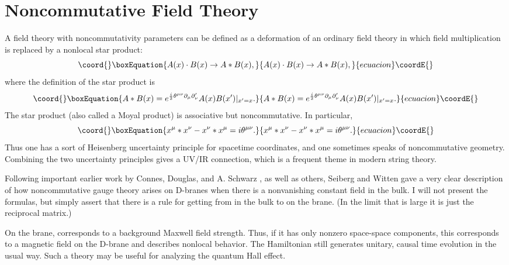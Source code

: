 \documentclass[a4paper,12pt]{article}
\begin{document}
\section{Noncommutative Field Theory}

A field theory with noncommutativity parameters \myHighlight{$\theta^{\mu\nu} =
- \theta^{\nu\mu}$}\coordHE{} can be defined as a deformation of an ordinary
field theory in which field multiplication is replaced by a
nonlocal star product:
\begin{equation}\coord{}\boxEquation{
A(x) \cdot B(x) \rightarrow A * B (x),
}{
A(x) \cdot B(x) \rightarrow A * B (x),
}{ecuacion}\coordE{}\end{equation}
where the definition of the star product is
\begin{equation}\coord{}\boxEquation{
A * B (x) = e^{\frac{i}{2} \theta^{\mu\nu} \partial_{\mu}
\partial'_{\nu}} A (x) B (x') |_{x' = x}.
}{
A * B (x) = e^{\frac{i}{2} \theta^{\mu\nu} \partial_{\mu}
\partial'_{\nu}} A (x) B (x') |_{x' = x}.
}{ecuacion}\coordE{}\end{equation}
The star product (also called a Moyal product) is associative but
noncommutative. In particular,
\begin{equation}\coord{}\boxEquation{
x^\mu * x^\nu - x^\nu * x^\mu = i \theta^{\mu\nu}.
}{
x^\mu * x^\nu - x^\nu * x^\mu = i \theta^{\mu\nu}.
}{ecuacion}\coordE{}\end{equation}
Thus one has a sort of Heisenberg uncertainty principle for
spacetime coordinates, and one sometimes speaks of noncommutative
geometry. Combining the two uncertainty principles gives a UV/IR
connection, which is a frequent theme in modern string theory.

Following important earlier work by Connes, Douglas, and A.
Schwarz \cite{CDS}, as well as others, Seiberg and Witten \cite{SW} gave a very clear
description of how noncommutative gauge theory arises on D-branes
when there is a nonvanishing constant \coordHE{} field in the bulk.
I will not present the formulas, but simply assert that there is a
rule for getting from \coordHE{} in the bulk to
\myHighlight{$\theta^{\mu\nu}$}\coordHE{} on the brane.  (In the limit that \coordHE{} is large
it is just the reciprocal matrix.)

On the brane, \myHighlight{$\theta^{\mu\nu}$}\coordHE{} corresponds to a background
Maxwell field strength.  Thus, if it has only nonzero space-space
components, this corresponds to a magnetic field on the D-brane
and describes nonlocal behavior.  The Hamiltonian still generates
unitary, causal time evolution in the usual way. Such a theory may
be useful for analyzing the quantum Hall effect.
\end{document}
